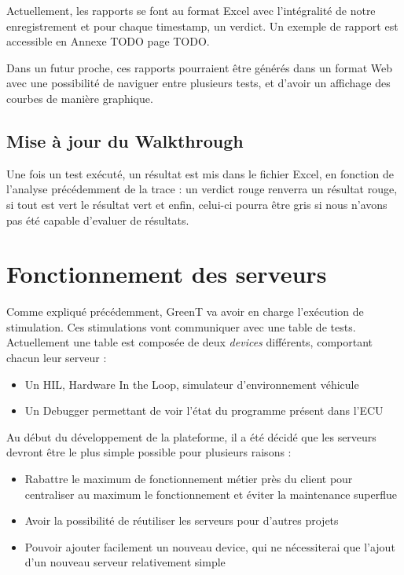 	Actuellement, les rapports se font au format Excel avec l'intégralité de notre enregistrement et pour chaque timestamp, un verdict. Un
	exemple de rapport est accessible en Annexe TODO page TODO. 
	
	Dans un futur proche, ces rapports pourraient être générés dans un format Web avec une possibilité de naviguer entre plusieurs tests, et
	d'avoir un affichage des courbes de manière graphique.

	\subsection{Mise à jour du Walkthrough}
	Une fois un test exécuté, un résultat est mis dans le fichier Excel, en fonction de l'analyse précédemment de la trace : un verdict rouge renverra un résultat rouge, si tout est vert le résultat vert et enfin, celui-ci pourra être gris si nous n'avons pas été capable d'evaluer de résultats.


	\section{Fonctionnement des serveurs}
	Comme expliqué précédemment, GreenT va avoir en charge l'exécution de stimulation. Ces stimulations vont communiquer avec une table de
	tests. Actuellement une table est composée de deux \textit{devices} différents, comportant chacun leur serveur : 
	\begin{itemize}
		\item Un HIL, Hardware In the Loop, simulateur d'environnement véhicule
		\item Un Debugger permettant de voir l'état du programme présent dans l'ECU
	\end{itemize}

	Au début du développement de la plateforme, il a été décidé que les serveurs devront être le plus simple possible pour plusieurs raisons
	: 
	\begin{itemize}
		\item Rabattre le maximum de fonctionnement métier près du client pour centraliser au maximum le fonctionnement et éviter la
			maintenance superflue
		\item Avoir la possibilité de réutiliser les serveurs pour d'autres projets
		\item Pouvoir ajouter facilement un nouveau device, qui ne nécessiterai que l'ajout d'un nouveau serveur relativement simple
	\end{itemize}
	
